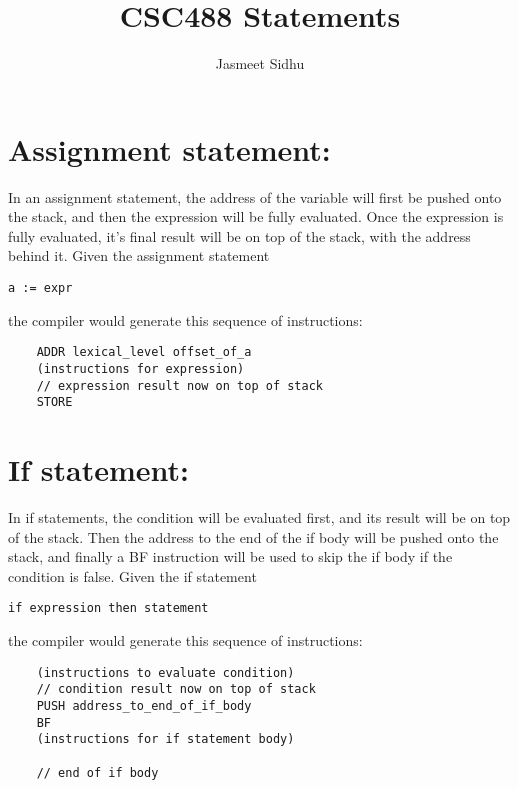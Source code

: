 \documentclass{article}
\author{Jasmeet Sidhu}
\title{CSC488 Statements}
\begin{document}
\maketitle


\section{Assignment statement:}
In an assignment statement, the address of the variable will first be pushed onto the stack,
and then the expression will be fully evaluated. Once the expression is fully evaluated, it's final result will be on top of the stack, with the address behind it.
\newline
\newline
Given the assignment statement
\begin{lstlisting}
a := expr
\end{lstlisting}
the compiler would generate this sequence of instructions:
\newline
\begin{lstlisting}
    ADDR lexical_level offset_of_a
    (instructions for expression)
    // expression result now on top of stack
    STORE
\end{lstlisting}

\section{If statement:}
In if statements, the condition will be evaluated first, and its result will be on top of the stack. Then the address to the end of the if body will be pushed onto the stack, and finally a BF instruction will be used to skip the if body if the condition is false.
\newline
\newline
Given the if statement
\begin{lstlisting}
if expression then statement
\end{lstlisting}
the compiler would generate this sequence of instructions:
\begin{lstlisting}
    (instructions to evaluate condition)
    // condition result now on top of stack
    PUSH address_to_end_of_if_body
    BF
    (instructions for if statement body)
    
    // end of if body
\end{lstlisting}
\end{document}
